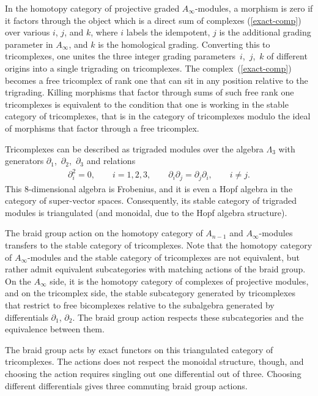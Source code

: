 \documentclass[pdftex]{sigma}
\theoremstyle{definition}
\numberwithin{equation}{section}
\begin{document}
In the homotopy category of projective graded $A_{\infty}$-modules, a morphism is zero if it factors through the object which is a direct sum of complexes (\ref{exact-comp}) over various $i$, $j$, and $k$, where $i$ labels the idempotent, $j$ is the additional grading parameter in $A_{\infty}$, and $k$ is the homological grading. Converting this to tricomplexes, one unites the three integer grading parameters~$i$,~$j$,~$k$ of different origins into a single trigrading on tricomplexes. The complex~(\ref{exact-comp}) becomes a free tricomplex of rank one that can sit in any position relative to the trigrading. Killing morphisms that factor through sums of such free rank one tricomplexes is equivalent to the condition that one is working in the stable category of tricomplexes, that is in the category of tricomplexes modulo the ideal of morphisms that factor through a free tricomplex.

Tricomplexes can be described as trigraded modules over the algebra
$\Lambda_3$ with generators $\partial_1$,~$\partial_2$,~$\partial_3$ and relations
\begin{gather*} \partial_i^2 =0, \qquad i=1,2,3, \qquad \partial_i\partial_j = \partial_j\partial_i , \qquad i\not= j.
\end{gather*}
This 8-dimensional algebra is Frobenius, and it is even a Hopf algebra in the category of super-vector spaces. Consequently, its stable category of trigraded modules is triangulated (and monoidal, due to the Hopf algebra structure).

The braid group action on the homotopy category of $A_{n-1}$ and $A_{\infty}$-modules transfers to the stable category of tricomplexes. Note that the homotopy category of $A_{\infty}$-modules and the stable category of tricomplexes are not equivalent, but rather admit equivalent subcategories with matching actions of the braid group. On the $A_{\infty}$ side, it is the homotopy category of complexes of projective modules, and on the tricomplex side, the stable subcategory generated by tricomplexes that restrict to free bicomplexes relative to the subalgebra generated by differentials $\partial_1$, $\partial_2$.
The braid group action respects these subcategories and the equivalence between them.

The braid group acts by exact functors on this triangulated category of tricomplexes. The actions does not respect the monoidal structure, though, and choosing the action requires singling out one differential out of three. Choosing different differentials gives three commuting braid group actions.
\end{document}
